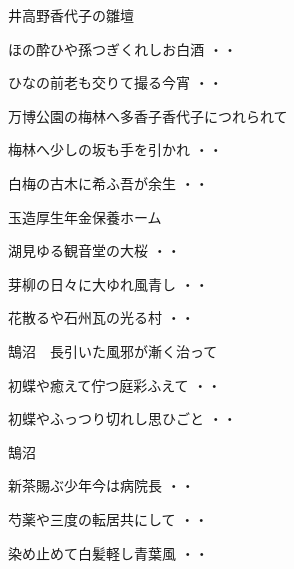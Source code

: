 \vspace{0.4cm}
井高野香代子の雛壇
\begin{shiika}ほの酔ひや孫つぎくれしお白酒
\hfill{・・}\end{shiika}
\begin{shiika}ひなの前老も交りて撮る今宵
\hfill{・・}\end{shiika}
\vspace{0.4cm}
万博公園の梅林へ多香子香代子につれられて
\begin{shiika}梅林へ少しの坂も手を引かれ
\hfill{・・}\end{shiika}
\begin{shiika}白梅の古木に希ふ吾が余生
\hfill{・・}\end{shiika}
\vspace{0.4cm}
玉造厚生年金保養ホーム
\begin{shiika}湖見ゆる観音堂の大桜
\hfill{・・}\end{shiika}
\begin{shiika}芽柳の日々に大ゆれ風青し
\hfill{・・}\end{shiika}
\begin{shiika}花散るや石州瓦の光る村
\hfill{・・}\end{shiika}
\vspace{0.4cm}
鵠沼　長引いた風邪が漸く治って
\begin{shiika}初蝶や癒えて佇つ庭彩ふえて
\hfill{・・}\end{shiika}
\begin{shiika}初蝶やふっつり切れし思ひごと
\hfill{・・}\end{shiika}
\vspace{0.4cm}
鵠沼
\begin{shiika}新茶賜ぶ少年今は病院長
\hfill{・・}\end{shiika}
\begin{shiika}芍薬や三度の転居共にして
\hfill{・・}\end{shiika}
\vspace{0.4cm}
\begin{shiika}染め止めて白髪軽し青葉風
\hfill{・・}\end{shiika}
